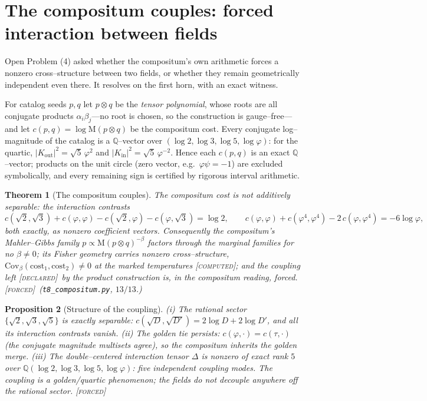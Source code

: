 \documentclass[11pt]{article}
\newtheorem{theorem}{Theorem}[section]
\newtheorem{proposition}[theorem]{Proposition}
\theoremstyle{definition}
\newcommand{\ph}{\varphi}
\newcommand{\Q}{\mathbb{Q}}
\newcommand{\Mah}{\mathrm{M}}
\newcommand{\forcedtag}{{\scshape [forced]}}
\newcommand{\declaredtag}{{\scshape [declared]}}
\newcommand{\computedtag}{{\scshape [computed]}}
\begin{document}
\section{The compositum couples: forced interaction between fields}\label{sec:compositum}

Open Problem (4) asked whether the compositum's own arithmetic forces a nonzero cross--structure
between two fields, or whether they remain geometrically independent even there. It resolves on
the first horn, with an exact witness.

For catalog seeds $p,q$ let $p\otimes q$ be the \emph{tensor polynomial}, whose roots are all
conjugate products $\alpha_i\beta_j$---no root is chosen, so the construction is gauge--free---and
let $c(p,q)=\log\Mah(p\otimes q)$ be the compositum cost. Every conjugate log--magnitude of the
catalog is a $\Q$--vector over $(\log2,\log3,\log5,\log\ph)$: for the quartic,
$|K_{\mathrm{out}}|^2=\sqrt5\,\ph^{2}$ and $|K_{\mathrm{in}}|^2=\sqrt5\,\ph^{-2}$. Hence each
$c(p,q)$ is an exact $\Q$--vector; products on the unit circle (zero vector, e.g.\ $\ph\psi=-1$)
are excluded symbolically, and every remaining sign is certified by rigorous interval arithmetic.

\begin{theorem}[The compositum couples]\label{thm:coupled}
The compositum cost is not additively separable: the interaction contrasts
\[
c(\sqrt2,\sqrt3)+c(\ph,\ph)-c(\sqrt2,\ph)-c(\ph,\sqrt3)=\log 2,
\qquad
c(\ph,\ph)+c(\ph^4,\ph^4)-2\,c(\ph,\ph^4)=-6\log\ph,
\]
both exactly, as nonzero coefficient vectors. Consequently the compositum's Mahler--Gibbs family
$p\propto\Mah(p\otimes q)^{-\beta}$ factors through the marginal families for no $\beta\ne0$; its
Fisher geometry carries nonzero cross--structure,
$\mathrm{Cov}_\beta(\mathrm{cost}_1,\mathrm{cost}_2)\ne0$ at the marked temperatures
\computedtag; and the coupling left \declaredtag\ by the product construction is, in the
compositum reading, \emph{forced}. \forcedtag\ (\texttt{t8\_compositum.py}, $13/13$.)
\end{theorem}

\begin{proposition}[Structure of the coupling]\label{prop:coupstruct}
(i) The rational sector $\{\sqrt2,\sqrt3,\sqrt5\}$ is exactly separable:
$c(\sqrt D,\sqrt{D'})=2\log D+2\log D'$, and all its interaction contrasts vanish. (ii) The
golden tie persists: $c(\ph,\cdot)=c(\tau,\cdot)$ (the conjugate magnitude multisets agree), so
the compositum inherits the golden merge. (iii) The double--centered interaction tensor $\Delta$
is nonzero of exact rank $5$ over $\Q(\log2,\log3,\log5,\log\ph)$: five independent coupling
modes. The coupling is a golden/quartic phenomenon; the fields do not decouple anywhere off the
rational sector. \forcedtag
\end{proposition}
\end{document}
